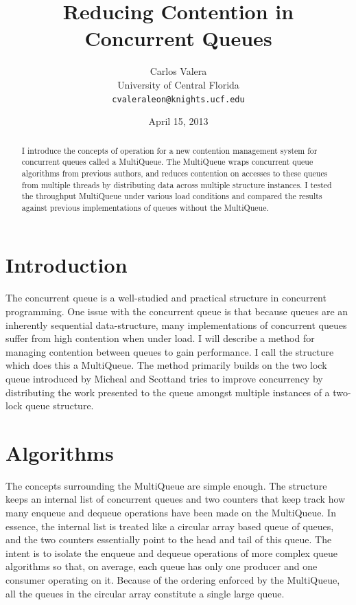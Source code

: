\documentclass[12pt]{report}
\begin{document}
\title{Reducing Contention in Concurrent Queues}
\author{Carlos Valera \\
    University of Central Florida \\
    \texttt{cvaleraleon@knights.ucf.edu}}
\date{April 15, 2013}
\maketitle
\begin{abstract}
I introduce the concepts of operation for a new contention management system
for concurrent queues called a MultiQueue. The MultiQueue wraps concurrent
queue algorithms from previous authors, and reduces contention on accesses to
these queues from multiple threads by distributing data across multiple
structure instances. I tested the throughput MultiQueue under various
load conditions and compared the results against previous implementations of
queues without the MultiQueue.
\end{abstract}
\section{Introduction}
The concurrent queue is a well-studied and practical structure in concurrent
programming. One issue with the concurrent queue is that because queues are an
inherently sequential data-structure, many implementations of concurrent queues
suffer from high contention when under load. I will describe a method for
managing contention between queues to gain performance. I call the structure
which does this a MultiQueue. The method primarily builds on the two lock queue
introduced by Micheal and Scott\cite{michael1996}and tries to improve
concurrency by distributing the work presented to the queue amongst multiple
instances of a two-lock queue structure. 

\section{Algorithms}
The concepts surrounding the MultiQueue are simple enough. The structure keeps
an internal list of concurrent queues and two counters that keep track how many
enqueue and dequeue operations have been made on the MultiQueue. In essence,
the internal list is treated like a circular array based queue of queues, and
the two counters essentially point to the head and tail of this queue. The
intent is to isolate the enqueue and dequeue operations of more complex queue
algorithms so that, on average, each queue has only one producer and one
consumer operating on it. Because of the ordering enforced by the MultiQueue,
all the queues in the circular array constitute a single large queue.
\end{document}

